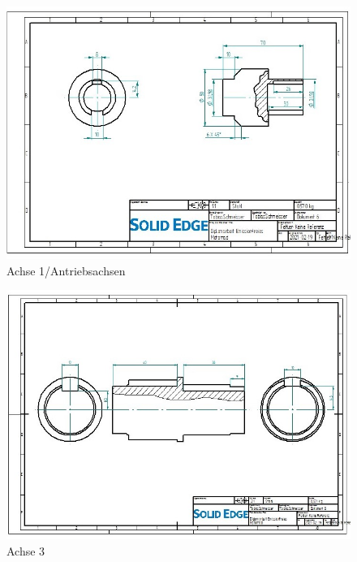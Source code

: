 \begin{figure} [H]
	\begin{center}
		\includegraphics[angle=90]{figures/mechanik/Antriebsachse_Zeichnung.jpg}
		\caption{Achse 1/Antriebsachsen}
		\label{fig:Achse 1/Antriebsachsen}
	\end{center}
\end{figure}

\begin{figure} [H]
	\begin{center}
		\includegraphics[angle=90]{figures/mechanik/Achse_mit_nuten_Zeichnung.jpg}
		\caption{Achse 3}
		\label{fig:Achse3}
	\end{center}
\end{figure}

